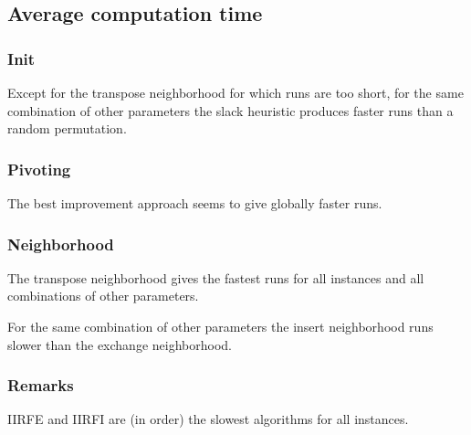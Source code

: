 \subsection{Average computation time}


\subsubsection{Init}

Except for the transpose neighborhood for which runs are too short, for the same combination of other parameters the slack heuristic produces faster runs than a random permutation.

\subsubsection{Pivoting}

The best improvement approach seems to give globally faster runs.

\subsubsection{Neighborhood}

The transpose neighborhood gives the fastest runs for all instances and all combinations of other parameters.

For the same combination of other parameters the insert neighborhood runs slower than the exchange neighborhood.


\subsubsection{Remarks}

IIRFE and IIRFI are (in order) the slowest algorithms for all instances.
